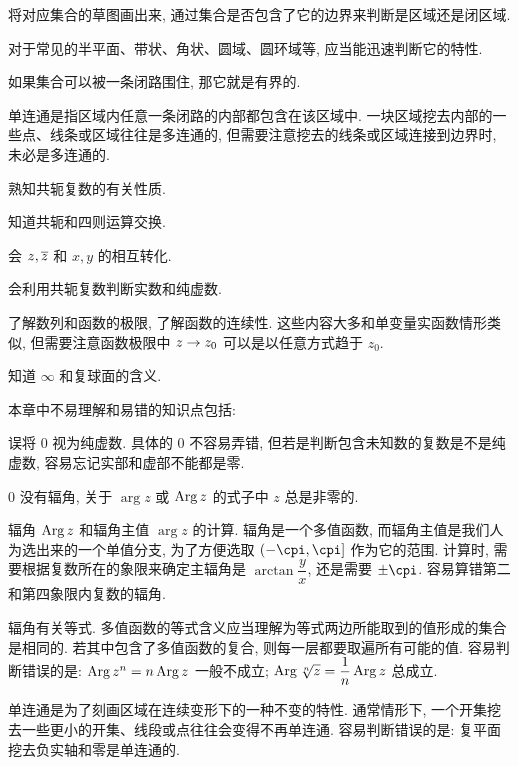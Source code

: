 \begin{conclusion}
  \begin{conclusion}
    \item 将对应集合的草图画出来, 通过集合是否包含了它的边界来判断是区域还是闭区域.
    \item 对于常见的半平面、带状、角状、圆域、圆环域等, 应当能迅速判断它的特性.
    \item 如果集合可以被一条闭路围住, 那它就是有界的.
    \item 单连通是指区域内任意一条闭路的内部都包含在该区域中.
    一块区域挖去内部的一些点、线条或区域往往是多连通的,  但需要注意挖去的线条或区域连接到边界时, 未必是多连通的.
  \end{conclusion}
  \item 熟知共轭复数的有关性质.
  \begin{conclusion}
    \item 知道共轭和四则运算交换.
    \item 会 $z,\overline z$ 和 $x,y$ 的相互转化.
    \item 会利用共轭复数判断实数和纯虚数.
  \end{conclusion}
  \item 了解数列和函数的极限, 了解函数的连续性. 这些内容大多和单变量实函数情形类似, 但需要注意函数极限中 $z\rightarrow z_0$ 可以是以任意方式趋于 $z_0$.
  \item 知道 $\infty$ 和复球面的含义.
\end{conclusion}

本章中不易理解和易错的知识点包括:
\begin{enuma}
  \item 误将 $0$ 视为纯虚数. 具体的 $0$ 不容易弄错, 但若是判断包含未知数的复数是不是纯虚数, 容易忘记实部和虚部不能都是零.
  \item $0$ 没有辐角, 关于 $\arg z$ 或 $\operatorname{Arg} z$ 的式子中 $z$ 总是非零的.
  \item 辐角 $\operatorname{Arg} z$ 和辐角主值 $\arg z$ 的计算. 辐角是一个多值函数, 而辐角主值是我们人为选出来的一个单值分支, 为了方便选取 $(-\cpi,\cpi]$ 作为它的范围. 计算时, 需要根据复数所在的象限来确定主辐角是 $\arctan\dfrac yx$, 还是需要 $\pm\cpi$. 
  容易算错第二和第四象限内复数的辐角.
  \item 辐角有关等式. 多值函数的等式含义应当理解为等式两边所能取到的值形成的集合是相同的. 若其中包含了多值函数的复合, 则每一层都要取遍所有可能的值.
  容易判断错误的是: $\operatorname{Arg} z^n=n\operatorname{Arg} z$ 一般不成立; $\operatorname{Arg} \sqrt[n]z=\dfrac1n\operatorname{Arg} z$ 总成立.
  \item 单连通是为了刻画区域在连续变形下的一种不变的特性. 通常情形下, 一个开集挖去一些更小的开集、线段或点往往会变得不再单连通.
  容易判断错误的是: 复平面挖去负实轴和零是单连通的.
\end{enuma}


